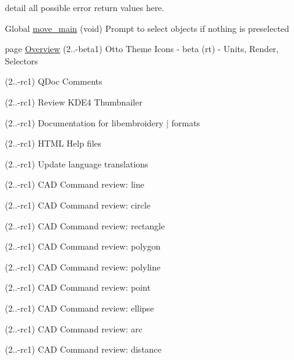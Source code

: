\begin{DoxyRefList}
\label{todo__todo000005}%
%
detail all possible error return values here.  
\item[Global \mbox{\hyperlink{src_2main_8c_a55555197c724d3b2a543e87077876399}{move\+\_\+main}} (void)]\label{todo__todo000225}%
%
Prompt to select objects if nothing is preselected  
\item[page \mbox{\hyperlink{index}{Overview}} ]\label{todo__todo000259}%
%
(2..-\/beta1) Otto Theme Icons -\/ beta (rt) -\/ Units, Render, Selectors

\label{todo__todo000260}%
%
(2..-\/rc1) QDoc Comments

\label{todo__todo000261}%
%
(2..-\/rc1) Review KDE4 Thumbnailer

\label{todo__todo000262}%
%
(2..-\/rc1) Documentation for libembroidery $|$ formats

\label{todo__todo000263}%
%
(2..-\/rc1) HTML Help files

\label{todo__todo000264}%
%
(2..-\/rc1) Update language translations

\label{todo__todo000265}%
%
(2..-\/rc1) CAD Command review\+: line

\label{todo__todo000266}%
%
(2..-\/rc1) CAD Command review\+: circle

\label{todo__todo000267}%
%
(2..-\/rc1) CAD Command review\+: rectangle

\label{todo__todo000268}%
%
(2..-\/rc1) CAD Command review\+: polygon

\label{todo__todo000269}%
%
(2..-\/rc1) CAD Command review\+: polyline

\label{todo__todo000270}%
%
(2..-\/rc1) CAD Command review\+: point

\label{todo__todo000271}%
%
(2..-\/rc1) CAD Command review\+: ellipse

\label{todo__todo000272}%
%
(2..-\/rc1) CAD Command review\+: arc

\label{todo__todo000273}%
%
(2..-\/rc1) CAD Command review\+: distance


\end{DoxyRefList}
